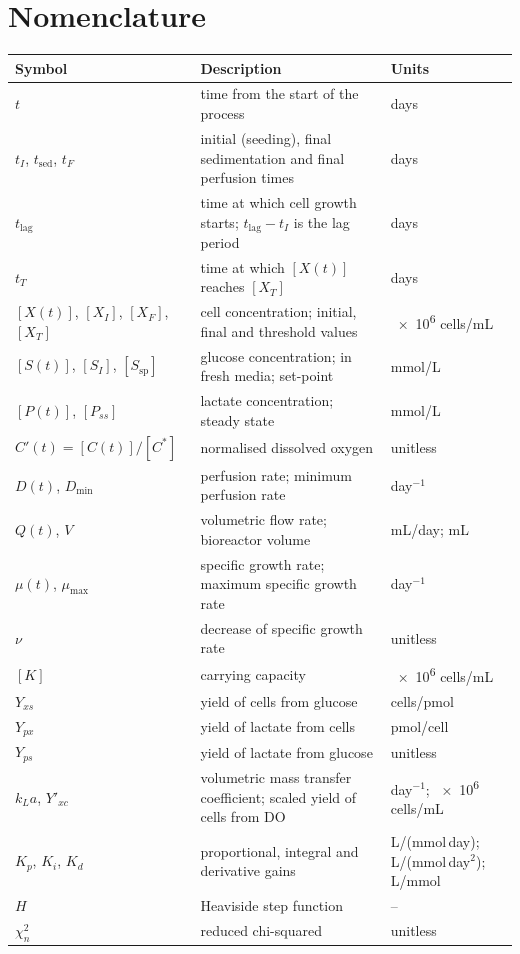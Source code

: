 \documentclass[11pt,a4paper]{article}
\newcommand{\kla}{k_La}
\newcommand{\tlag}{t_{\mathrm{lag}}}
\newcommand{\tsed}{t_{\mathrm{sed}}}
\newcommand{\mumax}{\mu_{\max}}
\newcommand{\Ssp}{[S_{\mathrm{sp}}]}
\newcommand{\cS}{[S(t)]}
\newcommand{\cP}{[P(t)]}
\newcommand{\cX}{[X(t)]}
\begin{document}
\section*{Nomenclature}
\begin{center}\small
\begin{longtable}{@{}p{} p{} p{}@{}}
\toprule
Symbol & Description & Units \\
\midrule
$t$ & time from the start of the process & days \\
$t_I$, $\tsed$, $t_F$ & initial (seeding), final sedimentation and final perfusion times & days \\
$\tlag$ & time at which cell growth starts; $\tlag-t_I$ is the lag period & days \\
$t_T$ & time at which $\cX$ reaches $[X_T]$ & days \\
$\cX$, $[X_I]$, $[X_F]$, $[X_T]$ & cell concentration; initial, final and threshold values & \num{e6} cells/mL \\
$\cS$, $[S_I]$, $\Ssp$ & glucose concentration; in fresh media; set-point & mmol/L \\
$\cP$, $[P_{ss}]$ & lactate concentration; steady state & mmol/L \\
$C'(t) = [C(t)]/[C^*]$ & normalised dissolved oxygen & unitless \\
$D(t)$, $D_{\min}$ & perfusion rate; minimum perfusion rate & day$^{-1}$ \\
$Q(t)$, $V$ & volumetric flow rate; bioreactor volume & mL/day; mL \\
$\mu(t)$, $\mumax$ & specific growth rate; maximum specific growth rate & day$^{-1}$ \\
$\nu$ & decrease of specific growth rate & unitless \\
$[K]$ & carrying capacity & \num{e6} cells/mL \\
$Y_{xs}$ & yield of cells from glucose & cells/pmol \\
$Y_{px}$ & yield of lactate from cells & pmol/cell \\
$Y_{ps}$ & yield of lactate from glucose & unitless \\
$\kla$, $Y'_{xc}$ & volumetric mass transfer coefficient; scaled yield of cells from DO & day$^{-1}$; \num{e6} cells/mL \\
$K_p$, $K_i$, $K_d$ & proportional, integral and derivative gains & L/(mmol\,day); L/(mmol\,day$^2$); L/mmol \\
$H$ & Heaviside step function & -- \\
$\chi^2_n$ & reduced chi-squared & unitless \\
\bottomrule
\end{longtable}
\end{center}
\end{document}
